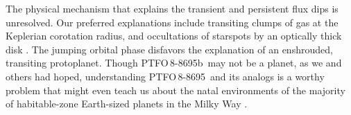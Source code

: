 \documentclass[12pt,twocolumn,tighten]{aastex62}
\newcommand{\ptfo}{PTFO$\,$8-8695}
\newcommand{\ptfob}{PTFO$\,$8-8695b}
\begin{document}
The physical mechanism that explains the transient and persistent flux
dips is unresolved. Our preferred explanations include
transiting clumps of gas at the Keplerian corotation radius, and
occultations of starspots by an optically thick disk \citep[{\it
e.g.},][]{stauffer_orbiting_2017,david_transient_2017,zhan_complex_2019}.
The jumping orbital phase disfavors the explanation of an
enshrouded, transiting protoplanet.  Though \ptfob\ may not be a planet,
as we and others had hoped, understanding \ptfo\ and its analogs is a worthy
problem that might even teach us about the natal environments of the
majority of habitable-zone Earth-sized planets in the Milky Way
\citep{dressing_occurrence_2013}.



\end{document}
